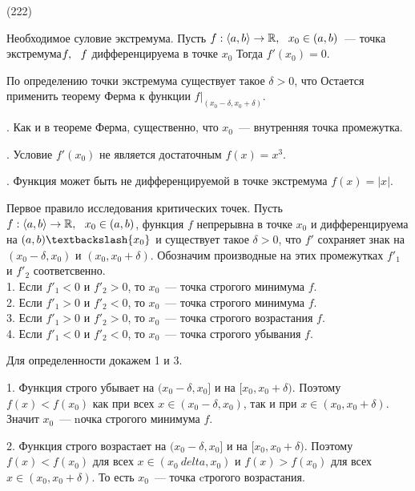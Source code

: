 (222)

\T \q Необходимое суловие экстремума. Пусть $f: \langle a, b \rangle \to \mathbb{R},\ \  x_0 \in (a, b)$~--- точка экстремума$f,\ \  f$ дифференцируема в точке $x_0$ Тогда $f'(x_0) = 0$.

\D По определению точки экстремума существует такое $\delta > 0$, что  Остается применить теорему Ферма к функции $f|_{(x_0 - \delta, x_0 + \delta)}.$

. Как и в теореме Ферма, существенно, что $x_0$~--- внутренняя точка промежутка.

. Условие $f'(x_0)$ не является достаточным $f(x) = x^3$.

. Функция может быть не дифференцируемой в точке экстремума $f(x) = |x|$.

\T \q Первое правило исследования критических точек. Пусть $f: \langle a, b \rangle \to \mathbb{R},\ \  x_0 \in (a, b)$, функция $f$ непрерывна в точке $x_0$ и дифференцируема на $(a, b) \bsl \{x_0\}$ и существует такое $\delta > 0$, что $f'$ сохраняет знак на $(x_0 - \delta, x_0)$ и $(x_0, x_0 + \delta)$. Обозначим производные на этих промежутках $f'_1$ и $f'_2$ соответсвенно.\\
1. Если $f'_1 < 0$ и $f'_2 > 0$, то $x_0$~--- точка строгого минимума $f$.\\
2. Если $f'_1 > 0$ и $f'_2 < 0$, то $x_0$~--- точка строгого минимума $f$.\\
3. Если $f'_1 > 0$ и $f'_2 > 0$, то $x_0$~--- точка строгого возрастания $f$.\\
4. Если $f'_1 < 0$ и $f'_2 < 0$, то $x_0$~--- точка строгого убывания $f$.

\D Для определенности докажем 1 и 3.

1. Функция строго убывает на $(x_0 - \delta, x_0]$ и на $[x_0, x_0 + \delta)$. Поэтому $f(x) < f(x_0)$ как при всех $x\in (x_0 - \delta, x_0)$, так и при $x \in (x_0, x_0 + \delta)$. Значит $x_0$~--- nочка строгого минимума $f$.

2. Функция строго возрастает на $(x_0 - \delta, x_0]$ и на $[x_0, x_0 + \delta)$. Поэтому $f(x) < f(x_0)$ для всех $x \in (x_0 \ delta, x_0)$ и $f(x) > f(x_0)$ для всех $x \in (x_0, x_0 + \delta)$. То есть $x_0$~--- точка cтрогого возрастания.